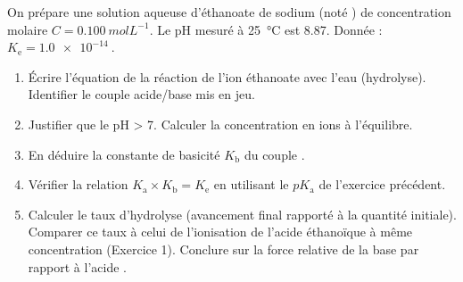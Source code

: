 \documentclass[11pt]{article}
\begin{document}
\begin{exercice}
On prépare une solution aqueuse d'éthanoate de sodium  (noté ) de concentration molaire $C = \SI{0.100}{mol L^{-1}}$. Le pH mesuré à \SI{25}{\celsius} est \num{8.87}. Donnée : $K_{\text{e}} = \SI{1.0e-14}{}$.
\begin{enumerate}
    \item Écrire l'équation de la réaction de l'ion éthanoate  avec l'eau (hydrolyse). Identifier le couple acide/base mis en jeu.
    \item Justifier que le pH > 7. Calculer la concentration en ions  à l'équilibre.
    \item En déduire la constante de basicité $K_{\text{b}}$ du couple .
    \item Vérifier la relation $K_{\text{a}} \times K_{\text{b}} = K_{\text{e}}$ en utilisant le $pK_{\text{a}}$ de l'exercice précédent.
    \item Calculer le taux d'hydrolyse (avancement final rapporté à la quantité initiale). Comparer ce taux à celui de l'ionisation de l'acide éthanoïque à même concentration (Exercice 1). Conclure sur la force relative de la base  par rapport à l'acide .
\end{enumerate}
\end{exercice}
\end{document}
